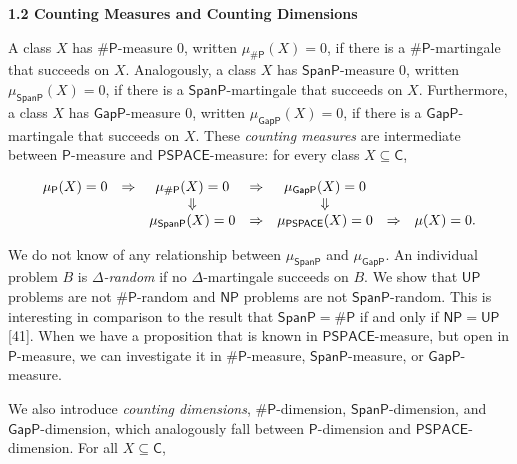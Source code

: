 \par\medskip\noindent\textbf{
1.2 Counting Measures and Counting Dimensions}\par




A class $X$ has ${\mathsf{\#}\mathsf{P}}$-measure 0, written $\mu_{{\mathsf{\#}\mathsf{P}}}(X)=0$,
if there is a ${\mathsf{\#}\mathsf{P}}$-martingale that succeeds on $X$.
Analogously, a class $X$ has $\mathsf{SpanP}$-measure 0, written $\mu_{\mathsf{SpanP}}(X)=0$,
if there is a $\mathsf{SpanP}$-martingale that succeeds on $X$. Furthermore, a class $X$ has
$\mathsf{GapP}$-measure 0, written $\mu_{\mathsf{GapP}}(X)=0$, if there is a $\mathsf{GapP}$-martingale that succeeds on $X$.
These \emph{counting measures} are
intermediate between $\mathsf{P}$-measure and $\mathsf{PSPACE}$-measure:
for every class $X\subseteq\mathsf{C}$,\par


\[\begin{gathered}
\begin{array}[]{ccccccc}\mu_{\mathsf{P}}(X)=0&\Rightarrow&\mu_{{\mathsf{\#}\mathsf{P}}}(X)=0&\Rightarrow&\mu_{\mathsf{GapP}}(X)=0\\
&&\Downarrow&&\Downarrow\\
&&\mu_{\mathsf{SpanP}}(X)=0&\Rightarrow&\mu_{\mathsf{PSPACE}}(X)=0&\Rightarrow&\mu(X)=0.\end{array}
\end{gathered}\]


We do not know of any relationship between $\mu_{\mathsf{SpanP}}$ and $\mu_{\mathsf{GapP}}$.
An individual problem $B$ is $\Delta$\emph{-random} if no $\Delta$-martingale succeeds on $B$.
We show that $\mathsf{UP}$ problems are not ${\mathsf{\#}\mathsf{P}}$-random and $\mathsf{NP}$ problems are not $\mathsf{SpanP}$-random. This is interesting in comparison to the result that $\mathsf{SpanP}={\mathsf{\#}\mathsf{P}}$ if and only if $\mathsf{NP}=\mathsf{UP}$ [41].
When we have a proposition that is known in $\mathsf{PSPACE}$-measure, but open in
$\mathsf{P}$-measure, we can investigate it in ${\mathsf{\#}\mathsf{P}}$-measure, $\mathsf{SpanP}$-measure, or $\mathsf{GapP}$-measure.\par




We also introduce \emph{counting dimensions}, ${\mathsf{\#}\mathsf{P}}$-dimension, $\mathsf{SpanP}$-dimension, and $\mathsf{GapP}$-dimension, which analogously fall between $\mathsf{P}$-dimension and $\mathsf{PSPACE}$-dimension. For all $X\subseteq\mathsf{C}$,\par


